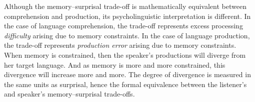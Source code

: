 Although the memory--surprisal trade-off is mathematically equivalent between comprehension and production, its psycholinguistic interpretation is different. In the case of language comprehension, the trade-off represents excess processing \emph{difficulty} arising due to memory constraints. In the case of language production, the trade-off represents \emph{production error} arising due to memory constraints. When memory is constrained, then the speaker's productions will diverge from her target language. And as memory is more and more constrained, this divergence will increase more and more. The degree of divergence is measured in the same units as surprisal, hence the formal equivalence between the listener's and speaker's memory--surprisal trade-offs. 





























